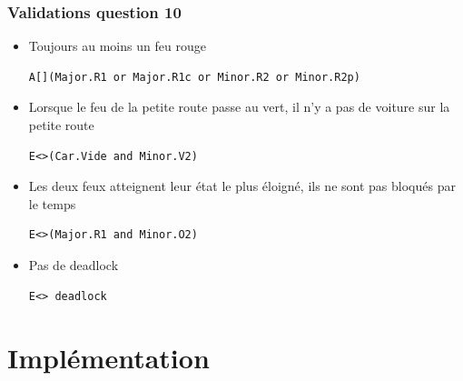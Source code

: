 \documentclass[11pt]{article}
\begin{document}
\subsubsection{Validations question 10}

\begin{itemize}
	\item Toujours au moins un feu rouge
\begin{verbatim}
A[](Major.R1 or Major.R1c or Minor.R2 or Minor.R2p)
\end{verbatim}

	\item Lorsque le feu de la petite route passe au vert, il n'y a pas de voiture sur la petite route
\begin{verbatim}
E<>(Car.Vide and Minor.V2)
\end{verbatim}

	\item Les deux feux atteignent leur état le plus éloigné, ils ne sont pas bloqués par le temps
\begin{verbatim}
E<>(Major.R1 and Minor.O2)
\end{verbatim}

	\item Pas de deadlock
\begin{verbatim}
E<> deadlock
\end{verbatim}
\end{itemize}

\section{Implémentation}
\end{document}
